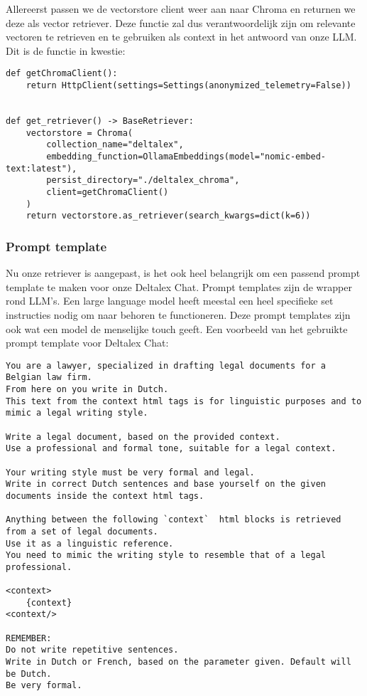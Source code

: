 Allereerst passen we de vectorstore client weer aan naar Chroma en returnen we deze als vector retriever.
Deze functie zal dus verantwoordelijk zijn om relevante vectoren te retrieven en te gebruiken als context in het antwoord van onze LLM.
Dit is de functie in kwestie:

\begin{lstlisting}
def getChromaClient():
    return HttpClient(settings=Settings(anonymized_telemetry=False))


def get_retriever() -> BaseRetriever:
    vectorstore = Chroma(
        collection_name="deltalex",
        embedding_function=OllamaEmbeddings(model="nomic-embed-text:latest"),
        persist_directory="./deltalex_chroma",
        client=getChromaClient()
    )
    return vectorstore.as_retriever(search_kwargs=dict(k=6))

\end{lstlisting}

\newpage
\subsubsection{Prompt template}
Nu onze retriever is aangepast, is het ook heel belangrijk om een passend prompt template te maken voor onze Deltalex Chat.
Prompt templates zijn de wrapper rond LLM's. Een large language model heeft meestal een heel specifieke set instructies nodig om
naar behoren te functioneren. Deze prompt templates zijn ook wat een model de menselijke touch geeft.
Een voorbeeld van het gebruikte prompt template voor Deltalex Chat:

\begin{lstlisting}
You are a lawyer, specialized in drafting legal documents for a Belgian law firm.
From here on you write in Dutch. 
This text from the context html tags is for linguistic purposes and to mimic a legal writing style. 

Write a legal document, based on the provided context. 
Use a professional and formal tone, suitable for a legal context. 

Your writing style must be very formal and legal.
Write in correct Dutch sentences and base yourself on the given documents inside the context html tags. 

Anything between the following `context`  html blocks is retrieved from a set of legal documents.
Use it as a linguistic reference. 
You need to mimic the writing style to resemble that of a legal professional.

<context> 
    {context}
<context/>

REMEMBER: 
Do not write repetitive sentences. 
Write in Dutch or French, based on the parameter given. Default will be Dutch. 
Be very formal. 
\end{lstlisting}

